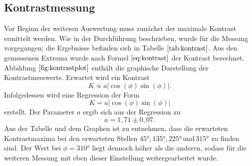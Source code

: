 \subsection{Kontrastmessung}
Vor Beginn der weiteren Auswertung muss zunächst der maximale Kontrast ermittelt werden.
Wie in der Durchführung beschrieben, wurde für die Messung vorgegangen; die Ergebnisse befinden sich in Tabelle $\ref{tab:kontrast}$.
Aus den gemessenen Extrema wurde nach Formel $\ref{eq:kontrast}$ der Kontrast berechnet.
Abbildung $\ref{fig:kontrastplot}$ enthält die graphische Darstellung der Kontrastmesswerte.
Erwartet wird ein Kontrast
\begin{equation}
  K \propto a|\cos(\phi)\sin(\phi)|.
\end{equation}
Infolgedessen wird eine Regression der Form
\begin{equation}
  K = a|\cos(\phi)\sin(\phi)|
\end{equation}
erstellt. Der Parameter $a$ ergib sich aus der Regression zu
\begin{equation*}
  a = 1,71 \pm 0,07.
\end{equation*}
Aus der Tabelle und dem Graphen ist zu entnehmen, dass die erwarteten Kontrastmaxima bei den erwarteten Stellen $45° , 135° , 225° \, \text{und} \, 315°$ zu finden sind.
Der Wert bei $\phi = 310°$ liegt dennoch höher als die anderen, sodass für die weiteren Messung mit eben dieser Einstellung weitergearbeitet wurde.
